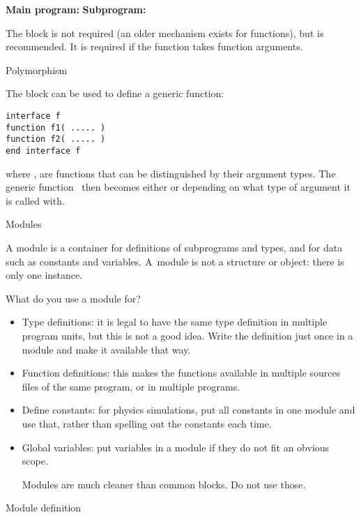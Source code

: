 \begin{multicols}{2}
\textbf{Main program:}
\vfill\columnbreak
\textbf{Subprogram:}
\end{multicols}

The  block is not required (an older
 mechanism exists for functions), but is
recommended.
It is required if the function takes function arguments.

 {Polymorphism}

The  block can be used to define a generic
function:
\begin{verbatim}
interface f
function f1( ..... )
function f2( ..... )
end interface f
\end{verbatim}
where , are functions that can be distinguished by their
argument types. The generic function~ then becomes either 
or  depending on what type of argument it is called with.

 {Modules}
\label{sec:modulef}

A module is a container for definitions of subprograms and types, and
for data such as constants and variables. A~module is not a 
structure or object: there is only one instance.

What do you use a module for?
\begin{itemize}
\item Type definitions: it is legal to have the same type definition
  in multiple program units, but this is not a good idea. 
  Write the definition just once in a module and make it available
  that way.
\item Function definitions: this makes the functions available in multiple
  sources files of the same program, or in multiple programs.
\item Define constants: for physics simulations, put all constants in
  one module and use that, rather than spelling out the constants each
  time.
\item Global variables: put variables in a module if they do not fit
  an obvious scope.
  \begin{f77note}
  Modules are much cleaner than common blocks. Do not use those.
  \end{f77note}
\end{itemize}
%
\begin{block}{Module definition}
  \label{sl:modulef}
\end{block}


